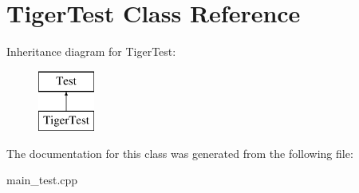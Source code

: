 \hypertarget{class_tiger_test}{}\section{Tiger\+Test Class Reference}
\label{class_tiger_test}
Inheritance diagram for Tiger\+Test\+:\begin{figure}[H]
\begin{center}
\leavevmode
\includegraphics[height=2.000000cm]{class_tiger_test}
\end{center}
\end{figure}


The documentation for this class was generated from the following file\+:\begin{DoxyCompactItemize}
\item 
main\+\_\+test.\+cpp\end{DoxyCompactItemize}
